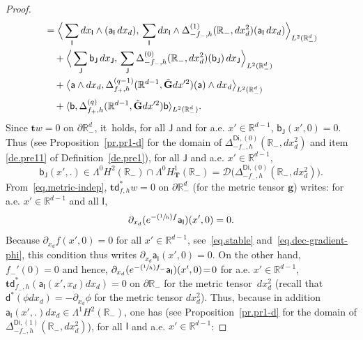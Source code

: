 \documentclass[10pt]{amsart}
\newcommand{\Psfrac}[2]{(\sfrac{#1}{#2})}
\newcommand{\mbf}[1]{\mathbf{#1}}
\let\lp\langle
\let\rp\rangle
\let\pa\partial
\theoremstyle{plain}
\theoremstyle{definition}
\begin{document}
\begin{proof}
\begin{align}
&= \Big \lp \sum_{\mathsf I} dx_{\mathsf I}\wedge (\mathsf a_{\mathsf I}\, dx_d), \, \sum_{ \mathsf I } dx_{\mathsf I}\wedge\Delta^{(1)}_{-f_-,h}(\mathbb R_-,dx_d^2)(\mathsf a_{\mathsf I} \, dx_d)\Big\rp_{L^2(\mathbb R^d_-)} \\
\nonumber
&\quad + \Big \lp \sum_{ \mathsf J } \mathsf b_{\mathsf J}\, dx_{\mathsf J},\, \sum_{ \mathsf J } \Delta^{(0)}_{-f_-,h}(\mathbb R_-,dx_d^2)(\mathsf b_{\mathsf J})\, dx_{\mathsf J}\Big\rp_{L^2(\mathbb R^d_-)}\\
\nonumber
&\quad +\big \lp \mathsf a \wedge dx_d,\Delta^{(q-1)}_{f_+,h}(\mathbb R^{d-1}, \tilde{\mbf G}dx'^2)(\mathsf a)\wedge dx_d \big\rp_{L^2(\mathbb R^d_-)} \\
&\quad +\lp \mathsf b,\Delta^{(q)}_{f_+,h}(\mathbb R^{d-1}, \tilde{\mbf G}dx'^2)\mathsf b\rp_{L^2(\mathbb R^d_-)}.\notag
\end{align}
Since $\mbf t w =0$ on $\pa \mathbb R^d_-$, it~holds, for all
$\mathsf J$ and for a.e. $x'\in \mathbb R^{d-1}$, $ \mathsf
b_{\mathsf J}(x',0)=0$. Thus (see Proposition~\ref{pr.pr1-d} for the
domain of $\Delta_{-f_-,h}^{\mathsf{Di},(0)}(\mathbb R_-, dx_d^2)$ and
item \eqref{de.pre11} of Definition~\ref{de.pre1}),
for all $\mathsf J$ and a.e. $x'\in \mathbb R^{d-1}$,
\[
\mathsf b_{\mathsf J}(x',.)\in \Lambda^0H^2 (\mathbb R_-)\cap
\Lambda^0H^1_{\mbf T} (\mathbb R_-) = \mathcal D \bigl(\Delta_{-f_-,h}^{\mathsf{Di},(0)}(\mathbb R_-, dx_d^2) \bigr).
\]
From~\eqref{eq.metric-indep}, $\mbf t \mathsf d_{f,h}^*w =0$ on $\pa \mathbb R^d_-$ (for the metric tensor $ \mbf g$) writes: for a.e. $x'\in \mathbb R^{d-1}$ and all $\mathsf I$,
\begin{equation}\label{eq.domd*}
\partial_{x_d}(e^{-\Psfrac 1hf}\mathsf a_{\mathsf I})(x',0)=0.
\end{equation}
Because $\partial_{x_d} f(x',0)=0$ for all $x'\in \mathbb R^{d-1}$, see~\eqref{eq.stable} and~\eqref{eq.dec-gradient-phi}, this condition thus writes $\partial_{x_d}\mathsf a_{\mathsf I}(x',0)\!=\!0$. On the other hand, $f_-'(0)\!=\!0$ and hence, \hbox{$\partial_{x_d}(e^{-\Psfrac 1h f_-}\mathsf a_{\mathsf I})(x',0)\!=\!0$} for a.e. $x'\in \mathbb R^{d-1}$, \ie $\mbf t \mathsf d_{f_-,h}^* (\mathsf a_{\mathsf I}(x',x_d)dx_d) =0$ on $\pa \mathbb R_-$ for the metric tensor~$dx_d^2$ (recall that $\mathsf d^*(\phi dx_d)=-\partial_{x_d}\phi$ for the metric tensor $ dx_d^2$). Thus, because in addition $\mathsf a_{\mathsf I}(x',.) dx_d \in \Lambda^1H^2 (\mathbb R_-)$, one has (see Proposition~\ref{pr.pr1-d} for the domain of $\Delta_{-f_-,h}^{\mathsf{Di},(1)}(\mathbb R_-, dx_d^2)$), for all $\mathsf I$ and a.e. $x'\in \mathbb R^{d-1}$:

\end{proof}
\end{document}
